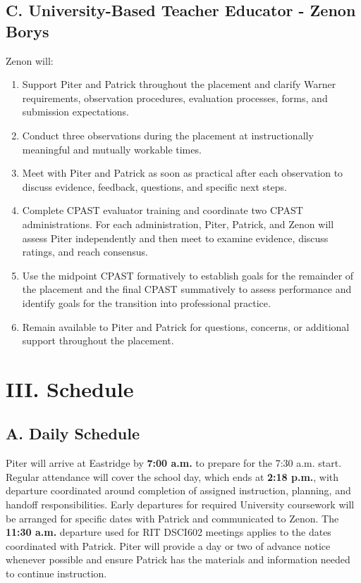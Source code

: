 \documentclass[10pt]{article}
\begin{document}
\subsection*{C. University-Based Teacher Educator - Zenon Borys}

Zenon will:
\begin{enumerate}
  \item Support Piter and Patrick throughout the placement and clarify Warner requirements, observation procedures, evaluation processes, forms, and submission expectations.
  \item Conduct three observations during the placement at instructionally meaningful and mutually workable times.
  \item Meet with Piter and Patrick as soon as practical after each observation to discuss evidence, feedback, questions, and specific next steps.
  \item Complete CPAST evaluator training and coordinate two CPAST administrations. For each administration, Piter, Patrick, and Zenon will assess Piter independently and then meet to examine evidence, discuss ratings, and reach consensus.
  \item Use the midpoint CPAST formatively to establish goals for the remainder of the placement and the final CPAST summatively to assess performance and identify goals for the transition into professional practice.
  \item Remain available to Piter and Patrick for questions, concerns, or additional support throughout the placement.
\end{enumerate}

\section*{III. Schedule}

\subsection*{A. Daily Schedule}

Piter will arrive at Eastridge by \textbf{7:00 a.m.} to prepare for the 7:30 a.m. start. Regular attendance will cover the school day, which ends at \textbf{2:18 p.m.}, with departure coordinated around completion of assigned instruction, planning, and handoff responsibilities. Early departures for required University coursework will be arranged for specific dates with Patrick and communicated to Zenon. The \textbf{11:30 a.m.} departure used for RIT DSCI602 meetings applies to the dates coordinated with Patrick. Piter will provide a day or two of advance notice whenever possible and ensure Patrick has the materials and information needed to continue instruction.
\end{document}

